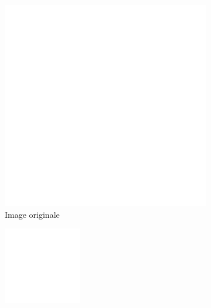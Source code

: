 \begin{figure}
    \centering

    \begin{subfigure}{.3\textwidth}
        \centering
        \includegraphics[width=\textwidth]{contenu/resources/images/gauss_0}
        \caption{Image originale}
    \end{subfigure}
    \hfill
    \begin{subfigure}{.3\textwidth}
        \centering
        \includegraphics[width=\textwidth]{contenu/resources/images/gauss_3}

\end{subfigure}
\end{figure}
